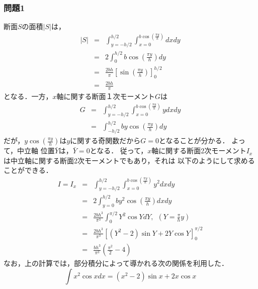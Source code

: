 \documentclass[10pt,a4j]{jarticle}
\begin{document}
\subsubsection*{問題1}
断面$S$の面積$\left| S \right|$は， 
\begin{eqnarray}
	\left| S\right| &= & 
	\int _{y=-h/2}^{h/2}\int _{x=0}^{b\cos\left(\frac{\pi y}{h}\right) } dxdy
	\nonumber
	\\
	&=& 
	2\int_{0}^{h/2} b\cos \left( \frac{\pi y}{h}\right) dy 
	\nonumber
	\\
	&=& 
	\frac{2bh}{\pi}\left[ \sin \left( \frac{\pi y}{h} \right)\right]_0^{h/2}
	\nonumber
	\\
	&=&
	\frac{2bh}{\pi}
\end{eqnarray}
となる．一方，$x$軸に関する断面１次モーメント$G$は
\begin{eqnarray}
	G &=& 
	\int _{y=-h/2}^{h/2}\int_{x=0}^{b\cos\left(\frac{\pi y}{h}\right) } ydxdy \\
	 &=& 
	\int_{-h/2}^{h/2} by\cos \left( \frac{\pi y}{h}\right) dy 
\end{eqnarray}
だが，$y\cos\left(\frac{\pi y}{h}\right)$は$y$に関する奇関数だから$G=0$となることが分かる．
よって，中立軸 位置$\bar Y$は，$\bar Y=0$となる．
従って，$x$軸に関する断面2次モーメント$I_x$は中立軸に関する断面2次モーメントでもあり，それは
以下のようにして求めることができる．
\begin{eqnarray}
	I=I_x &= & 
	\int _{y=-h/2}^{h/2} \int _{x=0}^{b\cos \left(\frac{\pi y }{h}\right)} y^2dxdy   
	\nonumber \\
	&=& 
	2\int _{y=0}^{h/2} b y^2\cos \left(\frac{\pi y }{h}\right) dxdy   
	\nonumber \\
	&=& 
	\frac{2bh^3}{\pi^3}\int_0^{\pi/2}	
	Y^2 \cos Y dY, \ \ \left(Y=\frac{\pi}{h}y\right)
	\nonumber \\
	&=& 
	\frac{2bh^3}{\pi^3}
	\left[ \left(Y^2-2\right)\sin Y +2 Y\cos Y \right]_{0}^{\pi/2}
	\nonumber \\
	&=& 
	\frac{bh^3}{\pi^3}\left( \frac{\pi^2}{2}-4 \right)
\end{eqnarray}
なお，上の計算では，部分積分によって導かれる次の関係を利用した．
\begin{equation}
	\int x^2 \cos x dx = (x^2-2)\sin x +2x\cos x
	\label{eqn:int_idt}
\end{equation}
\end{document}
